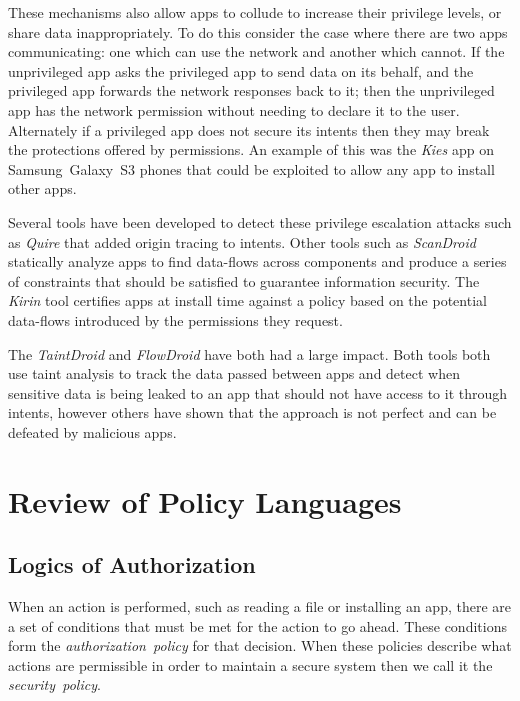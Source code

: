 \documentclass[a4paper,12pt,sfsidenotes]{tufte-book}
\begin{document}
These mechanisms also allow apps to collude to increase their privilege levels,
or share data inappropriately. To do this consider the case where there are two
apps communicating: one which can use the network and another which cannot. If
the unprivileged app asks the privileged app to send data on its behalf, and the
privileged app forwards the network responses back to it; then the unprivileged
app has the network permission without needing to declare it to the user.
Alternately if a privileged app does not secure its intents then they may break
the protections offered by permissions. An example of this was the \emph{Kies}
app on Samsung~Galaxy~S3 phones that could be exploited to allow any app to
install other apps\cite{moulu:8btkPowj}.

Several tools have been developed to detect these privilege escalation attacks
such as \emph{Quire}\cite{Bugiel:2012ui} that added origin tracing to intents.
Other tools such as \emph{ScanDroid}\cite{Fuchs:2009vi} statically analyze apps
to find data-flows across components and produce a series of constraints that
should be satisfied to guarantee information security. The
\emph{Kirin}\cite{Enck:2009ko} tool certifies apps at install time against a
policy based on the potential data-flows introduced by the permissions they
request.

The \emph{TaintDroid}\cite{Enck:2010uw} and \emph{FlowDroid}\cite{Fritz:2013vi}
have both had a large impact. Both tools both use taint analysis to track the
data passed between apps and detect when sensitive data is being leaked to an
app that should not have access to it through intents, however others have shown
that the approach is not perfect\cite{Sarwar:2013ta} and can be defeated by
malicious apps.


\section{Review of Policy Languages}

\subsection{Logics of Authorization}

When an action is performed, such as reading a file or installing an app, there
are a set of conditions that must be met for the action to go ahead. These
conditions form the \emph{authorization~policy} for that decision. When these
policies describe what actions are permissible in order to maintain a secure
system then we call it the \emph{security~policy}.
\end{document}

